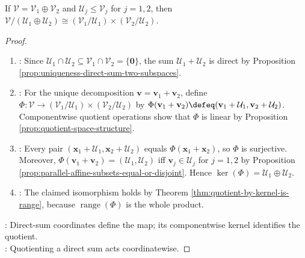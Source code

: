 \begin{proposition} \label{prop:quotient-of-direct-sum-by-direct-sum} \\
If $\mathcal{V}=\mathcal{V}_1\oplus\mathcal{V}_2$ and $\mathcal{U}_j\leq\mathcal{V}_j$ for $j=1,2$, then $\mathcal{V}/(\mathcal{U}_1\oplus\mathcal{U}_2)\cong(\mathcal{V}_1/\mathcal{U}_1)\times(\mathcal{V}_2/\mathcal{U}_2)$.
\begin{proof}
\begin{enumerate}[label=(\roman*)]
\setlength{\itemsep}{0pt}
\item {}: Since $\mathcal{U}_1\cap\mathcal{U}_2\subseteq\mathcal{V}_1\cap\mathcal{V}_2=\{\mathbf{0}\}$, the sum $\mathcal{U}_1+\mathcal{U}_2$ is direct by Proposition \ref{prop:uniqueness-direct-sum-two-subspaces}.
\item {}: For the unique decomposition $\mathbf{v}=\mathbf{v}_1+\mathbf{v}_2$, define $\Phi:\mathcal{V}\to(\mathcal{V}_1/\mathcal{U}_1)\times(\mathcal{V}_2/\mathcal{U}_2)$ by $\Phi(\mathbf{v}_1+\mathbf{v}_2)\defeq(\mathbf{v}_1+\mathcal{U}_1,\mathbf{v}_2+\mathcal{U}_2)$.\\
Componentwise quotient operations show that $\Phi$ is linear by Proposition \ref{prop:quotient-space-structure}.
\item {}: Every pair $(\mathbf{x}_1+\mathcal{U}_1,\mathbf{x}_2+\mathcal{U}_2)$ equals $\Phi(\mathbf{x}_1+\mathbf{x}_2)$, so $\Phi$ is surjective.\\
Moreover, $\Phi(\mathbf{v}_1+\mathbf{v}_2)=(\mathcal{U}_1,\mathcal{U}_2)$ iff $\mathbf{v}_j\in\mathcal{U}_j$ for $j=1,2$ by Proposition \ref{prop:parallel-affine-subsets-equal-or-disjoint}. Hence $\ker(\Phi)=\mathcal{U}_1\oplus\mathcal{U}_2$.
\item {}: The claimed isomorphism holds by Theorem \ref{thm:quotient-by-kernel-is-range}, because $\operatorname{range}(\Phi)$ is the whole product.
\end{enumerate}
: Direct-sum coordinates define the map; its componentwise kernel identifies the quotient.\\
: Quotienting a direct sum acts coordinatewise.
\end{proof}
\end{proposition}

